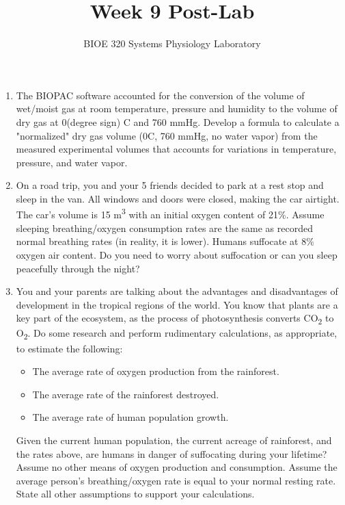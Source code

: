 \documentclass{article}
\title{Week 9 Post-Lab}
\author{BIOE 320 Systems Physiology Laboratory}
\date{}
\begin{document}
\maketitle
\large

\begin{enumerate}
	\item The BIOPAC software accounted for the conversion of the volume of wet/moist gas at room temperature, pressure and humidity to the volume of dry gas at 0(degree sign) C and 760 mmHg. Develop a formula to calculate a "normalized" dry gas volume (0C, 760 mmHg, no water vapor) from the measured experimental volumes that accounts for variations in temperature, pressure, and water vapor.
	\item On a road trip, you and your 5 friends decided to park at a rest stop and sleep in the van. All windows and doors were closed, making the car airtight. The car's volume is 15 m\textsuperscript{3} with an initial oxygen content of 21\%. Assume sleeping breathing/oxygen consumption rates are the same as recorded normal breathing rates (in reality, it is lower). Humans suffocate at 8\% oxygen air content. Do you need to worry about suffocation or can you sleep peacefully through the night?
	\item You and your parents are talking about the advantages and disadvantages of development in the tropical regions of the world. You know that plants are a key part of the ecosystem, as the process of photosynthesis converts CO\textsubscript{2} to O\textsubscript{2}. Do some research and perform rudimentary calculations, as appropriate, to estimate the following:\begin{itemize}
		\item The average rate of oxygen production from the rainforest.
		\item The average rate of the rainforest destroyed.
		\item The average rate of human population growth.
	\end{itemize} 
	
	Given the current human population, the current acreage of rainforest, and the rates above, are humans in danger of suffocating during your lifetime? Assume no other means of oxygen production and consumption. Assume the average person's breathing/oxygen rate is equal to your normal resting rate. State all other assumptions to support your calculations.
\end{enumerate}
\end{document}
